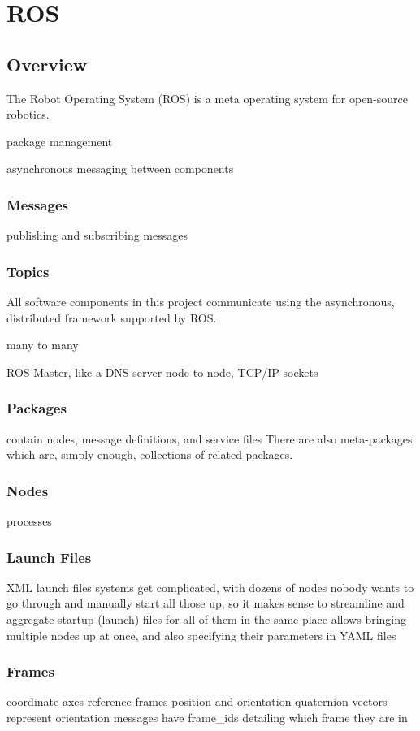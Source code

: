 \chapter{ROS}

\section{Overview}
The Robot Operating System (ROS) is a meta operating system for open-source robotics.

package management

asynchronous messaging between components

\subsection{Messages}
publishing and subscribing messages

\subsection{Topics}
All software components in this project communicate using the asynchronous, distributed framework supported by ROS.

many to many

ROS Master, like a DNS server
node to node, TCP/IP sockets

\subsection{Packages}
contain nodes, message definitions, and service files
There are also meta-packages which are, simply enough, collections of related packages.

\subsection{Nodes}
processes

\subsection{Launch Files}
XML launch files
systems get complicated, with dozens of nodes
nobody wants to go through and manually start all those up, so it makes sense to streamline and aggregate startup (launch) files for all of them in the same place
allows bringing multiple nodes up at once, and also specifying their parameters in YAML files

\subsection{Frames}
coordinate axes
reference frames
position and orientation
quaternion vectors represent orientation
messages have frame\_ids detailing which frame they are in

